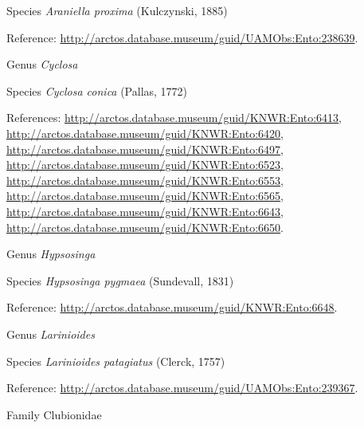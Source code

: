 \documentclass[9pt, article]{memoir}
\begin{document}
\begin{multicols}{2}
\vspace{6pt}\noindent\hspace{36pt}Species \textit{Araniella proxima} (Kulczynski, 1885)


\vspace{6pt}Reference: 
\url{http://arctos.database.museum/guid/UAMObs:Ento:238639}.

\vspace{6pt}\noindent\hspace{30pt}Genus \textit{Cyclosa}


\vspace{6pt}\noindent\hspace{36pt}Species \textit{Cyclosa conica} (Pallas, 1772)


\vspace{6pt}References: 
\url{http://arctos.database.museum/guid/KNWR:Ento:6413}, 
\url{http://arctos.database.museum/guid/KNWR:Ento:6420}, 
\url{http://arctos.database.museum/guid/KNWR:Ento:6497}, 
\url{http://arctos.database.museum/guid/KNWR:Ento:6523}, 
\url{http://arctos.database.museum/guid/KNWR:Ento:6553}, 
\url{http://arctos.database.museum/guid/KNWR:Ento:6565}, 
\url{http://arctos.database.museum/guid/KNWR:Ento:6643}, 
\url{http://arctos.database.museum/guid/KNWR:Ento:6650}.

\vspace{6pt}\noindent\hspace{30pt}Genus \textit{Hypsosinga}


\vspace{6pt}\noindent\hspace{36pt}Species \textit{Hypsosinga pygmaea} (Sundevall, 1831)


\vspace{6pt}Reference: 
\url{http://arctos.database.museum/guid/KNWR:Ento:6648}.

\vspace{6pt}\noindent\hspace{30pt}Genus \textit{Larinioides}


\vspace{6pt}\noindent\hspace{36pt}Species \textit{Larinioides patagiatus} (Clerck, 1757)


\vspace{6pt}Reference: 
\url{http://arctos.database.museum/guid/UAMObs:Ento:239367}.

\vspace{6pt}\noindent\hspace{24pt}Family Clubionidae



\end{multicols}
\end{document}
